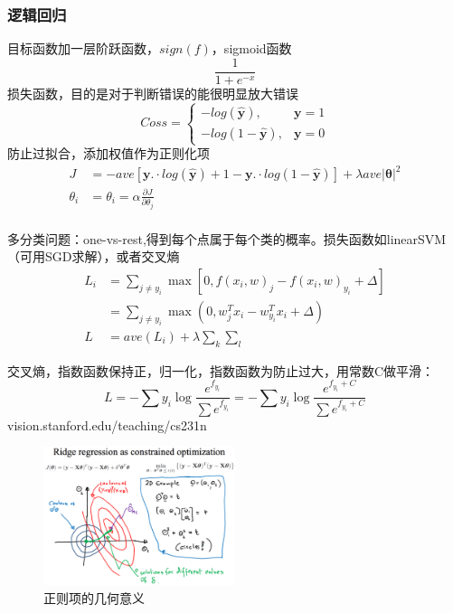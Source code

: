 \documentclass[UTF8]{../computerUniverse}
\begin{document}
\subsubsection{逻辑回归}
目标函数加一层阶跃函数，$sign(f)$，sigmoid函数
\begin{equation}
\frac{1}{1+e^{-x}}
\end{equation}
 损失函数，目的是对于判断错误的能很明显放大错误
\begin{equation}
Coss= \left\{
    \begin{aligned}
    -log(\hat {\mathbf y}),&\mathbf y=1\\
    -log(1-\hat {\mathbf y}),&\mathbf y=0
    \end{aligned}
    \right.
\end{equation}
防止过拟合，添加权值作为正则化项
\begin{equation}
    \begin{split}
    J&=-ave \left[
    {\mathbf y}.\cdot log(\hat {\mathbf y})
    +{1-\mathbf y}.\cdot log(1-\hat {\mathbf y})
\right]+\lambda ave|\mathbf \theta   |^2\\
        \theta_i&=\theta_i =\alpha \frac{\partial J}{\partial \theta_j}\\
    \end{split}
\end{equation}
 
多分类问题：one-vs-rest,得到每个点属于每个类的概率。损失函数如linearSVM（可用SGD求解），或者交叉熵
\begin{equation}
\begin{split}
    L_i & = \sum_{j\neq y_i} \max \left[ 0,f(x_i,w)_j-f(x_i,w)_{y_i}+\Delta  \right]\\
    &=\sum_{j \neq y_i} \max \left( 0,w_j^Tx_i-w_{y_i}^Tx_i +\Delta \right)\\
    L& = ave(L_i)+\lambda\sum_k \sum_l
\end{split}
\end{equation}

交叉熵，指数函数保持正，归一化，指数函数为防止过大，用常数C做平滑：
\begin{equation}
L=-\sum y_i \log \frac{e^{f_{y_i}}}{\sum e^{f_{y_i}}}
=-\sum y_i \log \frac{e^{f_{y_i}+C}}{\sum e^{f_{y_i}+C}}
\end{equation}
vision.stanford.edu/teaching/cs231n


\begin{figure}[h]
    \centering
    \includegraphics[width=0.5\textwidth]{Figures/regulation.eps}
    \caption{正则项的几何意义}
\end{figure}
\end{document}
